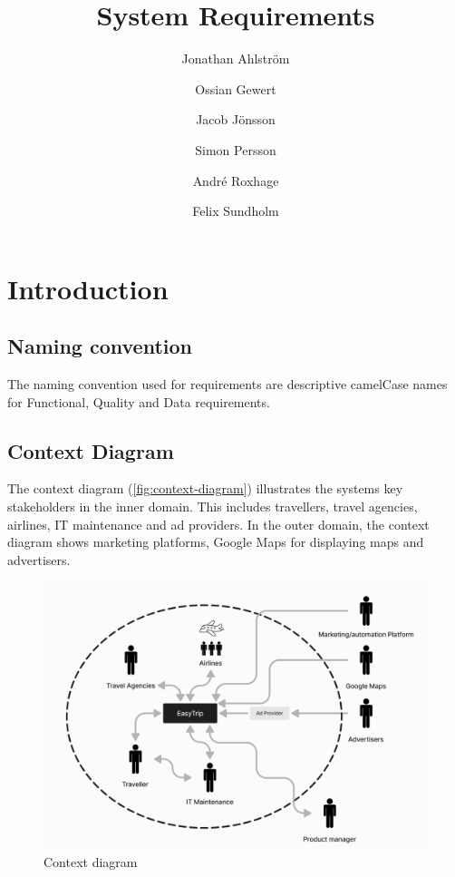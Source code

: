 \documentclass[a4paper]{article}
\title{System Requirements}
\author{Jonathan Ahlström \and Ossian Gewert \and Jacob Jönsson \and Simon Persson \and André Roxhage \and Felix Sundholm}
\begin{document}
\maketitle

\begin{center}
    
\end{center}

\newpage
\tableofcontents
\newpage

\section{Introduction}
\subsection{Naming convention}
The naming convention used for requirements are descriptive camelCase names for Functional, Quality and Data requirements.

\subsection{Context Diagram}
The context diagram (\autoref{fig:context-diagram}) illustrates the systems key stakeholders in the inner domain. This includes travellers, travel agencies, airlines, IT maintenance and ad providers. In the outer domain, the context diagram shows marketing platforms, Google Maps for displaying maps and advertisers.
\begin{figure}[H]
    \includegraphics[width=.99\textwidth]{resources/contextDiagram.png}
    \caption{Context diagram}
    \label{fig:context-diagram}
\end{figure}
\end{document}
